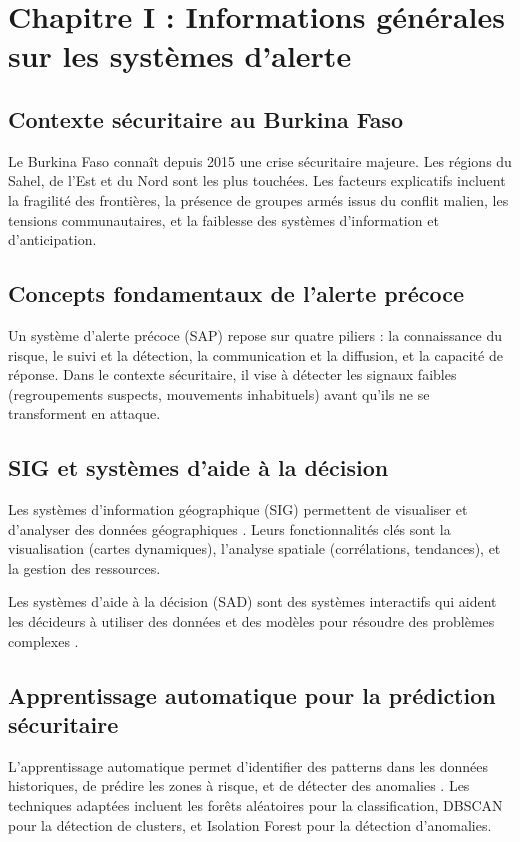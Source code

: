 \documentclass[12pt,a4paper]{article}
\begin{document}
\chapter{Chapitre I : Informations générales sur les systèmes d'alerte}

\section{Contexte sécuritaire au Burkina Faso}
Le Burkina Faso connaît depuis 2015 une crise sécuritaire majeure. Les régions du Sahel, de l'Est et du Nord sont les plus touchées. Les facteurs explicatifs incluent la fragilité des frontières, la présence de groupes armés issus du conflit malien, les tensions communautaires, et la faiblesse des systèmes d'information et d'anticipation.

\section{Concepts fondamentaux de l'alerte précoce}
Un système d'alerte précoce (SAP) repose sur quatre piliers \cite{nationsunies2006} : la connaissance du risque, le suivi et la détection, la communication et la diffusion, et la capacité de réponse. Dans le contexte sécuritaire, il vise à détecter les signaux faibles (regroupements suspects, mouvements inhabituels) avant qu'ils ne se transforment en attaque.

\section{SIG et systèmes d'aide à la décision}
Les systèmes d'information géographique (SIG) permettent de visualiser et d'analyser des données géographiques \cite{longley2015}. Leurs fonctionnalités clés sont la visualisation (cartes dynamiques), l'analyse spatiale (corrélations, tendances), et la gestion des ressources.

Les systèmes d'aide à la décision (SAD) sont des systèmes interactifs qui aident les décideurs à utiliser des données et des modèles pour résoudre des problèmes complexes \cite{turban2015}.

\section{Apprentissage automatique pour la prédiction sécuritaire}
L'apprentissage automatique permet d'identifier des patterns dans les données historiques, de prédire les zones à risque, et de détecter des anomalies \cite{geron2022}. Les techniques adaptées incluent les forêts aléatoires pour la classification, DBSCAN pour la détection de clusters, et Isolation Forest pour la détection d'anomalies.
\end{document}
